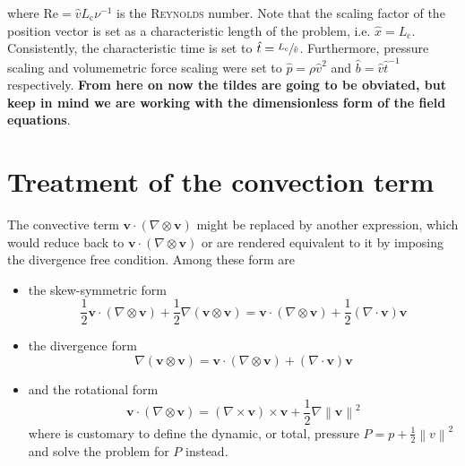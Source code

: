 \documentclass[]{scrartcl}
\newcommand{\bs}[1]{\boldsymbol{#1}}
\newcommand{\norm}[1]{\left\lVert #1 \right\rVert}
\begin{document}
where $\mathrm{Re} = \hat{v}L_\textrm{c}\nu^{-1}$ is the \textsc{Reynolds} number. Note that the scaling factor of the position vector is set as a characteristic length of the problem, i.e. $\hat{x} = L_\textrm{c}$. Consistently, the characteristic time is set to $\hat{t} = \sfrac{L_\textrm{c}}{\hat{v}}$. Furthermore, pressure scaling and volumemetric force scaling were set to $\hat{p} = \rho \hat{v}^2$ and $\hat{b} = \hat{v}\hat{t}^{-1}$ respectively. \textbf{From here on now the tildes are going to be obviated, but keep in mind we are working with the dimensionless form of the field equations}.\\

\section{Treatment of the convection term}
The convective term $\bs{v} \cdot (\nabla \otimes \bs{v})$ might be replaced by another expression, which would reduce back to  $\bs{v} \cdot (\nabla \otimes \bs{v})$ or are rendered equivalent to it  by imposing the divergence free condition. Among these form are
\begin{itemize}
	\item the skew-symmetric form
	\begin{equation}
		\label{Eqn:SkewSymmetricForm}
		\frac{1}{2}\bs{v} \cdot (\nabla \otimes \bs{v}) + \dfrac{1}{2} 	\nabla \left( \bs{v} \otimes \bs{v}\right) = \bs{v} \cdot (\nabla \otimes \bs{v}) + \dfrac{1}{2}(\nabla \cdot \bs{v})\bs{v}
	\end{equation}
	\item the divergence form
	\begin{equation}
		\label{Eqn:DivergenceForm}
		\nabla \left( \bs{v} \otimes \bs{v}\right) = \bs{v} \cdot (\nabla \otimes \bs{v}) + (\nabla \cdot \bs{v})\bs{v}
	\end{equation}
	\item and the rotational form
	\begin{equation}
		\label{Eqn:RotationalForm}
		\bs{v} \cdot (\nabla \otimes \bs{v}) = (\nabla \times \bs{v}) \times \bs{v} + \dfrac{1}{2} \nabla \norm{\bs{v}}^2
	\end{equation}
	where is customary to define the dynamic, or total, pressure $P = p +  \tfrac{1}{2} \norm{v}^2$ and solve the problem for $P$ instead.
\end{itemize}
\end{document}
